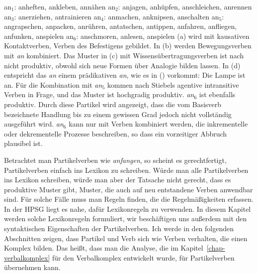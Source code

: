 \eal
\label{verschiedene-ans}
\ex an$_1$: anheften, ankleben, annähen                           
\ex an$_2$: anjagen,  anhüpfen, anschleichen, anrennen            
\ex an$_3$: anerziehen, antrainieren                              
\ex an$_4$: anmachen, anknipsen, anschalten                       
\ex an$_5$: angrapschen, anpacken, anrühren, antatschen, antippen,
            anfahren, anfliegen, anfunken, anspielen              
\ex an$_6$: anschmoren, anlesen, anspielen                        
\zl
(a) wird mit kausativen Kontaktverben, Verben des Befestigens gebildet. In
(b)
werden Bewegungsverben mit \emph{an} kombiniert. Das Muster in (c) mit Wissensübertragungsverben
ist nach \citet[]{Stiebels96a} nicht produktiv, obwohl sich neue Formen über Analogie bilden lassen.
In (d) entspricht das \emph{an} einem prädikativen \emph{an}, wie es in () vorkommt:
\ea
Die Lampe ist an.
\z
Für die Kombination mit \emph{an$_5$} kommen nach Stiebels agentive intransitive Verben in Frage,
und das Muster ist hochgradig produktiv.
\emph{an$_6$} ist ebenfalls produktiv. Durch diese Partikel wird angezeigt, dass die vom Basisverb
bezeichnete Handlung bis zu einem gewissen Grad jedoch nicht vollständig ausgeführt
wird. \emph{an$_6$} kann nur mit Verben kombiniert werden, die inkrementelle oder dekrementelle
Prozesse beschreiben, so dass ein vorzeitiger Abbruch plausibel ist.


Betrachtet man Partikelverben wie \emph{anfangen}, so scheint es gerechtfertigt, Partikelverben einfach
ins Lexikon zu schreiben. Würde man alle Partikelverben ins Lexikon schreiben, würde man aber der Tatsache
nicht gerecht, dass es produktive Muster gibt, \dash Muster, die auch auf neu entstandene Verben anwendbar
sind. Für solche Fälle muss man Regeln finden, die die Regelmäßigkeiten erfassen. In der HPSG liegt
es nahe, dafür Lexikonregeln zu verwenden. In diesem Kapitel werden solche Lexikonregeln formuliert,
wir beschäftigen uns außerdem mit den syntaktischen Eigenschaften der Partikelverben.
Ich werde in den folgenden Abschnitten zeigen, dass Partikel und Verb sich wie Verben verhalten,
die einen Komplex bilden. Das heißt, dass man die Analyse, die im Kapitel~\ref{chap-verbalkomplex}
für den Verbalkomplex entwickelt wurde, für Partikelverben übernehmen kann.

